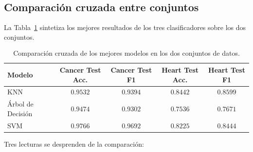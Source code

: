 \subsection{Comparación cruzada entre conjuntos}

La Tabla~\ref{tab:comparacion-final} sintetiza los mejores resultados de
los tres clasificadores sobre los dos conjuntos.

\begin{table}[H]
    \centering
    \begin{tabular}{lcccc}
        \toprule
        \rowcolor{headerblue}
        \textcolor{headertext}{\textbf{Modelo}}           &
        \textcolor{headertext}{\textbf{Cancer Test Acc.}} &
        \textcolor{headertext}{\textbf{Cancer Test F1}}   &
        \textcolor{headertext}{\textbf{Heart Test Acc.}}  &
        \textcolor{headertext}{\textbf{Heart Test F1}}                                                                                    \\
        \midrule
        KNN                                               & $0.9532$          & $0.9394$          & $\mathbf{0.8442}$ & $\mathbf{0.8599}$ \\
        Árbol de Decisión                                 & $0.9474$          & $0.9302$          & $0.7536$          & $0.7671$          \\
        SVM                                               & $\mathbf{0.9766}$ & $\mathbf{0.9692}$ & $0.8225$          & $0.8444$          \\
        \bottomrule
    \end{tabular}
    \caption{Comparación cruzada de los mejores modelos en los dos
        conjuntos de datos.}
    \label{tab:comparacion-final}
\end{table}

Tres lecturas se desprenden de la comparación:

